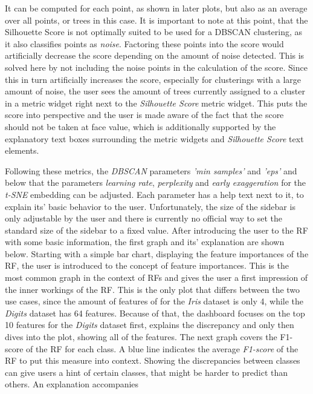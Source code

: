 \documentclass[a4paper, 12pt]{article}
\begin{document}
It can be computed for each point, as shown in later plots, but also as an average over all points, or
trees in this case. It is important to note at this point, that the Silhouette Score is not optimally
suited to be used for a DBSCAN clustering, as it also classifies points as \textit{noise}. Factoring
these points into the score would artificially decrease the score depending on the amount of noise
detected. This is solved here by not including the noise points in the calculation of the score.
Since this in turn artificially increases the score, especially for clusterings with a large amount of
noise, the user sees the amount of trees currently assigned to a cluster in a metric widget right next
to the \textit{Silhouette Score} metric widget. This puts the score into perspective and the user is
made aware of the fact that the score should not be taken at face value, which is additionally supported
by the explanatory text boxes surrounding the metric widgets and \textit{Silhouette Score} text elements.
\par
Following these metrics, the
\textit{DBSCAN} parameters \textit{'min samples'} and \textit{'eps'} and below that
the parameters \textit{learning rate}, \textit{perplexity} and \textit{early exaggeration} for the
\textit{t-SNE} embedding can be adjusted.
Each parameter has a help text next to it, to explain its' basic behavior to the user.
Unfortunately, the size of the sidebar is only adjustable by the user and there is currently no
official way to set the standard size of the sidebar to a fixed value.
After introducing the user to the RF with some basic information, the first graph and its' explanation
are shown below. Starting with a simple bar chart, displaying the feature importances of the RF,
the user is introduced to the concept of feature importances. This is the most common graph in the
context of RFs and gives the user a first impression of the inner workings of the RF. This is the only
plot that differs between the two use cases, since the amount of features of for the \textit{Iris} dataset
is only 4, while the \textit{Digits} dataset has 64 features. Because of that, the dashboard focuses on the
top 10 features for the \textit{Digits} dataset first, explains the discrepancy and only then dives into the
plot, showing all of the features.
The next graph covers the F1-score of the RF for each class. A blue line indicates the average
\textit{F1-score} of the RF to put this measure into context. Showing the discrepancies between classes can
give users a hint of certain classes, that might be harder to predict than others. An explanation accompanies
\end{document}
